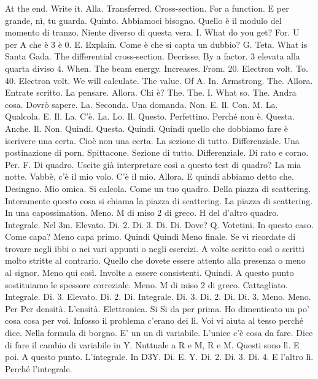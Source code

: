 \begin{soluzione}
{   At the end. Write it. Alla. Transferred. Cross-section. For a function. E per grande, nì, tu guarda. Quinto. Abbiamoci bisogno. Quello è il modulo del momento di tranzo. Niente diverso di questa vera. I. What do you get? For. U per A che è 3 è 0. E. Explain. Come è che si capta un dubbio? G. Teta. What is Santa Gada. The differential cross-section. Decrisse. By a factor. 3 elevata alla quarta diviso 4. When. The beam energy. Increases. From. 20. Electron volt. To. 40. Electron volt. We will calculate. The value. Of A. In. Armstrong. The. Allora. Entrate scritto. La pensare. Allora. Chi è? The. The. I. What so. The. Andra cosa. Dovrò sapere. La. Seconda. Una domanda. Non. E. Il. Con. M. La. Qualcola. E. Il. La. C'è. La. Lo. Il. Questo. Perfettino. Perché non è. Questa. Anche. Il. Non. Quindi. Questa. Quindi. Quindi quello che dobbiamo fare è iscrivere una certa. Cioè non una certa. La sezione di tutto. Differenziale. Una postinazione di porn. Spittacone. Sezione di tutto. Differenziale. Di rato e corno. Per. F. Di quadro. Uscite già interpretare così a questo test di quadro? La mia notte. Vabbè, c'è il mio volo. C'è il mio. Allora. E quindi abbiamo detto che. Desingno. Mio omica. Si calcola. Come un tuo quadro. Della piazza di scattering. Interamente questo cosa si chiama la piazza di scattering. La piazza di scattering. In una capossimation. Meno. M di miso 2 di greco. H del d'altro quadro. Integrale. Nel 3m. Elevato. Di. 2. Di. 3. Di. Di. Dove? Q. Votetini. In questo caso. Come capa? Meno capa primo. Quindi Quindi Meno finale. Se vi ricordate di trovare negli ibbi o nei vari appunti o negli esercizi. A volte scritto così o scritti molto stritte al contrario. Quello che dovete essere attento alla presenza o meno al signor. Meno qui così. Involte a essere consistenti. Quindi. A questo punto sostituiamo le spessore correziale. Meno. M di miso 2 di greco. Cattagliato. Integrale. Di. 3. Elevato. Di. 2. Di. Integrale. Di. 3. Di. 2. Di. Di. 3. Meno. Meno. Per Per densità. L'ensità. Elettronica. Si Si da per prima. Ho dimenticato un po' cosa cosa per voi. Infosso il problema c'erano dei lì. Voi vi aiuta al tesso perché dice. Nella formula di borgno. E' un un di variabile. L'unice c'è cosa da fare. Dice di fare il cambio di variabile in Y. Nuttuale a R e M, R e M. Questi sono lì. E poi. A questo punto. L'integrale. In D3Y. Di. E. Y. Di. 2. Di. 3. Di. 4. E l'altro lì. Perché l'integrale. 
   
}
\end{soluzione}

